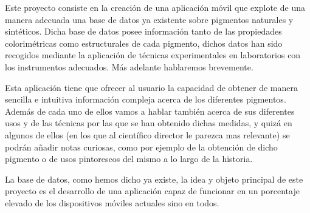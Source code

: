 Este proyecto consiste en la creación de una aplicación móvil que explote de una manera adecuada una base de datos ya existente sobre pigmentos naturales y sintéticos. Dicha base de datos posee información tanto de las propiedades colorimétricas como estructurales de cada pigmento, dichos datos han sido recogidos mediante la aplicación de técnicas experimentales en laboratorios con los instrumentos adecuados. Más adelante hablaremos brevemente.

Esta aplicación tiene que ofrecer al usuario la capacidad de obtener de manera sencilla e intuitiva información compleja acerca de los diferentes pigmentos. Además de cada uno de ellos vamos a hablar también acerca de sus diferentes usos y de las técnicas por las que se han obtenido dichas medidas, y quizá en algunos de ellos (en los que al científico director le parezca mas relevante) se podrán añadir notas curiosas, como por ejemplo de la obtención de dicho pigmento o de usos pintorescos del mismo a lo largo de la historia. 

La base de datos, como hemos dicho ya existe, la idea y objeto principal de este proyecto es el desarrollo de una aplicación capaz de funcionar en un porcentaje elevado de los dispositivos móviles actuales sino en todos. 
